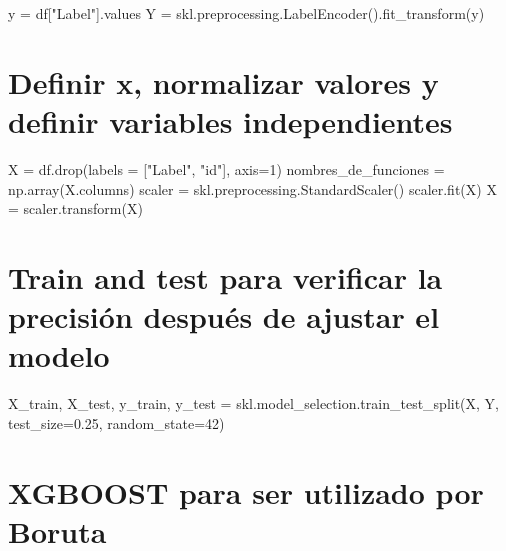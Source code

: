 \documentclass[
]{article}
\newenvironment{Shaded}{}{}
\newcommand{\DecValTok}[1]{\textcolor[rgb]{0.25,0.63,0.44}{#1}}
\newcommand{\FloatTok}[1]{\textcolor[rgb]{0.25,0.63,0.44}{#1}}
\newcommand{\NormalTok}[1]{#1}
\newcommand{\OperatorTok}[1]{\textcolor[rgb]{0.40,0.40,0.40}{#1}}
\newcommand{\StringTok}[1]{\textcolor[rgb]{0.25,0.44,0.63}{#1}}
\begin{document}
\begin{Shaded}
\begin{Highlighting}[]
\NormalTok{y }\OperatorTok{=}\NormalTok{ df[}\StringTok{"Label"}\NormalTok{].values}
\NormalTok{Y }\OperatorTok{=}\NormalTok{ skl.preprocessing.LabelEncoder().fit\_transform(y)}
\end{Highlighting}
\end{Shaded}

\hypertarget{definir-x-normalizar-valores-y-definir-variables-independientes}{%
\section{Definir x, normalizar valores y definir variables
independientes}\label{definir-x-normalizar-valores-y-definir-variables-independientes}}

\begin{Shaded}
\begin{Highlighting}[]
\NormalTok{X }\OperatorTok{=}\NormalTok{ df.drop(labels }\OperatorTok{=}\NormalTok{ [}\StringTok{"Label"}\NormalTok{, }\StringTok{"id"}\NormalTok{], axis}\OperatorTok{=}\DecValTok{1}\NormalTok{) }
\NormalTok{nombres\_de\_funciones }\OperatorTok{=}\NormalTok{ np.array(X.columns)}
\NormalTok{scaler }\OperatorTok{=}\NormalTok{ skl.preprocessing.StandardScaler()}
\NormalTok{scaler.fit(X)}
\NormalTok{X }\OperatorTok{=}\NormalTok{ scaler.transform(X)}
\end{Highlighting}
\end{Shaded}

\hypertarget{train-and-test-para-verificar-la-precisiuxf3n-despuuxe9s-de-ajustar-el-modelo}{%
\section{Train and test para verificar la precisión después de ajustar
el
modelo}\label{train-and-test-para-verificar-la-precisiuxf3n-despuuxe9s-de-ajustar-el-modelo}}

\begin{Shaded}
\begin{Highlighting}[]
\NormalTok{X\_train, X\_test, y\_train, y\_test }\OperatorTok{=}\NormalTok{ skl.model\_selection.train\_test\_split(X, Y, test\_size}\OperatorTok{=}\FloatTok{0.25}\NormalTok{, random\_state}\OperatorTok{=}\DecValTok{42}\NormalTok{)}
\end{Highlighting}
\end{Shaded}

\hypertarget{xgboost-para-ser-utilizado-por-boruta}{%
\section{XGBOOST para ser utilizado por
Boruta}\label{xgboost-para-ser-utilizado-por-boruta}}
\end{document}
